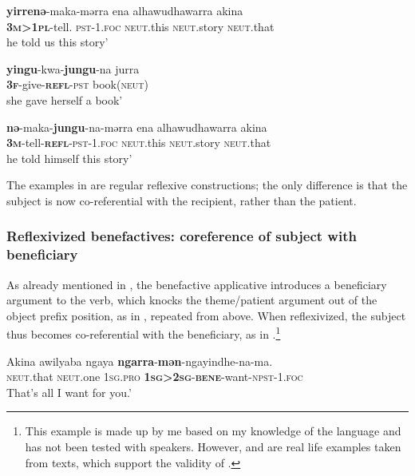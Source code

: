 \documentclass[output=paper]{langscibook}
\begin{document}
 \ex
 \label{ex:vanegmond:23b}
\gll \textbf{yirrenə}-maka-mərra ena alhawudhawarra akina\\
\textbf{\textsc{3m>1pl}}-tell. \textsc{pst}-1.\textsc{foc} \textsc{neut}.this \textsc{neut}.story \textsc{neut}.that\\
 he told us this story’
\z
\z


\ea%
 \label{ex:vanegmond:24}
 \ea
 \label{ex:vanegmond:24a}
\gll \textbf{yingu}{-kwa-}\textbf{jungu}-na jurra\\
\textbf{\textsc{3f}}\textsc{-}give-\textbf{\textsc{refl}}-\textsc{pst} book(\textsc{neut})\\
\glt she gave herself a book’

\ex
\label{ex:vanegmond:24b}
\gll \textbf{nə}-maka-\textbf{jungu}-na-mərra ena alhawudhawarra akina\\
\textbf{\textsc{3m}}-tell-\textbf{\textsc{refl}}-\textsc{pst}-1.\textsc{foc} \textsc{neut}.this \textsc{neut}.story \textsc{neut}.that\\
\glt he told himself this story’
\z
\z



The examples in  are regular reflexive constructions; the only difference is that the subject is now co-referential with the recipient, rather than the patient.



\subsubsection{Reflexivized benefactives: coreference of subject with beneficiary }\label{sec:vanegmond:3.2.2}



As already mentioned in , the benefactive applicative introduces a beneficiary argument to the verb, which knocks the theme/patient argument out of the object prefix position, as in , repeated from  above. When reflexivized, the subject thus becomes co-referential with the beneficiary, as in .\footnote{This example is made up by me based on my knowledge of the language and has not been tested with speakers. However,  and  are real life examples taken from texts, which support the validity of .}



\ea%
 \label{ex:vanegmond:25}

 \ea
 \label{ex:vanegmond:25a}
\gll Akina awilyaba ngaya \textbf{{ngarra}}{-}\textbf{{mən}}{-ngayindhe-na-ma}.\\
\textsc{neut}.that \textsc{neut}.one \textsc{1sg}.\textsc{pro} \textbf{\textsc{1sg>2sg}}-\textbf{\textsc{bene}}-want-\textsc{npst}-1.\textsc{foc}\\
\glt That’s all I want for you.’
\end{document}
